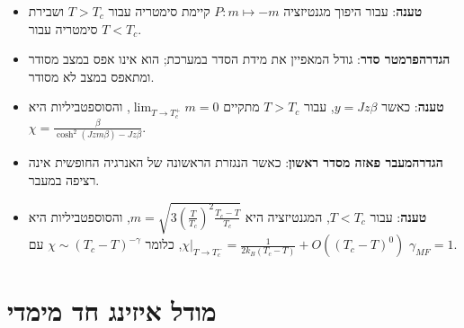 \documentclass{tstextbook}
\begin{document}
\begin{summary}
\begin{itemize}
    \item \textbf{טענה}: עבור היפוך מגנטיזציה \(P:m\mapsto -m\) קיימת סימטריה עבור \(T> T_{c}\) ושבירת סימטריה עבור \(T<T_{c}\).
    \item \textbf{הגדרה}\textbf{פרמטר סדר}: גודל המאפיין את מידת הסדר במערכת; הוא אינו אפס במצב מסודר ומתאפס במצב לא מסודר.
    \item \textbf{טענה}: כאשר \(y=Jz\beta\), עבור \(T> T_{c}\) מתקיים \(\operatorname*{lim}_{T\rightarrow T_{c}^{+}}m=0\), והסוספטביליות היא \(\chi=\frac{\beta}{\cosh^{2}\left(J z m\beta\right)-J z\beta}\).
    \item \textbf{הגדרה}\textbf{מעבר פאזה מסדר ראשון}: כאשר הנגזרת הראשונה של האנרגיה החופשית אינה רציפה במעבר.
    \item \textbf{טענה}: עבור \(T<T_{c}\), המגנטיזציה היא \(m=\sqrt{3\left(\frac{T}{T_{c}}\right)^{2}\frac{T_{c}-T}{T_{c}}}\), והסוספטביליות היא \(\chi\big|_{T\rightarrow T_{c}^{-}}=\frac{1}{2k_{B}\left(T_{c}-T\right)}+O\left((T_{c}-T)^{0}\right)\), כלומר \(\chi \sim (T_{c}-T)^{-\gamma}\) עם \(\gamma_{MF}=1\).
  \end{itemize}
\end{summary}
\section{מודל איזינג חד מימדי}
\end{document}

